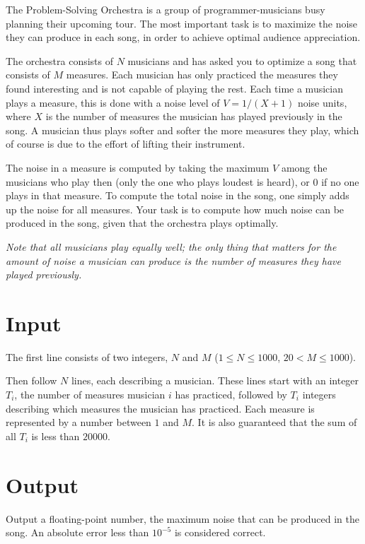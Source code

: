 
The Problem-Solving Orchestra is a group of programmer-musicians busy planning their upcoming tour. The most important task is to maximize the noise they can produce in each song, in order to achieve optimal audience appreciation.

The orchestra consists of $N$ musicians and has asked you to optimize a song that consists of $M$ measures. Each musician has only practiced the measures they found interesting and is not capable of playing the rest. Each time a musician plays a measure, this is done with a noise level of $V=1/(X+1)$ noise units, where $X$ is the number of measures the musician has played previously in the song. A musician thus plays softer and softer the more measures they play, which of course is due to the effort of lifting their instrument.

The noise in a measure is computed by taking the maximum $V$ among the musicians who play then (only the one who plays loudest is heard), or $0$ if no one plays in that measure. To compute the total noise in the song, one simply adds up the noise for all measures. Your task is to compute how much noise can be produced in the song, given that the orchestra plays optimally.

\emph{Note that all musicians play equally well; the only thing that matters for the amount of noise a musician can produce is the number of measures they have played previously.}

\section*{Input}
The first line consists of two integers, $N$ and $M$ ($1 \leq N \leq 1000$, $20 < M \leq 1000$).

Then follow $N$ lines, each describing a musician. These lines start with an integer $T_i$,
the number of measures musician $i$ has practiced, followed by $T_i$ integers describing which measures
the musician has practiced. Each measure is represented by a number between $1$ and $M$.
It is also guaranteed that the sum of all $T_i$ is less than $20000$.

\section*{Output}
Output a floating-point number, the maximum noise that can be produced in the song. An absolute error less than $10^{-5}$ is considered correct.

